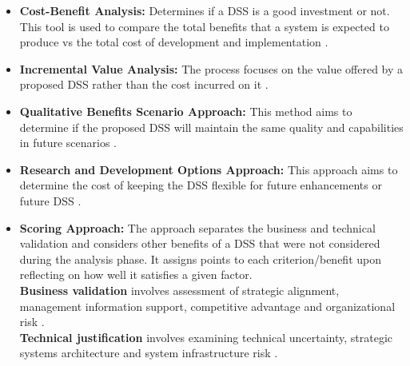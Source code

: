 \begin{itemize}
\item \textbf{Cost-Benefit Analysis:} Determines if a DSS is a good investment or not. This tool is used to compare the total benefits that a system is expected to produce vs the total cost of development and implementation \cite{DSS}. 
\item \textbf{Incremental Value Analysis:} The process focuses on the value offered by a proposed DSS rather than the cost incurred on it \cite{DSS}.
\item \textbf{Qualitative Benefits Scenario Approach:} This method aims to determine if the proposed DSS will maintain the same quality and capabilities in future scenarios \cite{DSS}.
\item \textbf{Research and Development Options Approach:} This approach aims to determine the cost of keeping the DSS flexible for future enhancements or future DSS \cite{DSS}.
\item \textbf{Scoring Approach:} The approach separates the business and technical validation and considers other benefits of a DSS that were not considered during the analysis phase. It assigns points to each criterion/benefit upon reflecting on how well it satisfies a given factor.\\
\indent \textbf{Business validation} involves assessment of strategic alignment, management information support, competitive advantage and organizational risk \cite{DSS}. \\
\indent \textbf{Technical justification} involves examining technical uncertainty, strategic systems architecture and system infrastructure risk \cite{DSS}.
\end{itemize}